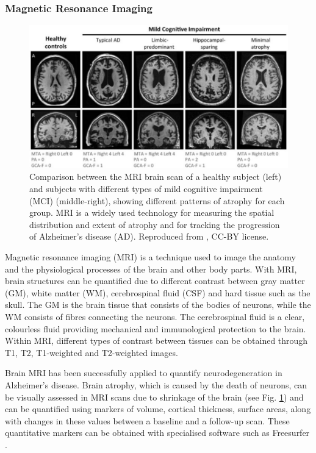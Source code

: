 \subsubsection{Magnetic Resonance Imaging}
\label{sec:bckMri}

\begin{figure}
\centering
\includegraphics[width=1.0\textwidth]{images/adAtrophy3}
\caption[Comparison between the MRI brain scans of healthy subjects and subjects with mild cognitive impairment]{Comparison between the MRI brain scan of a healthy subject (left) and subjects with different types of mild cognitive impairment (MCI) (middle-right), showing different patterns of atrophy for each group. MRI is a widely used technology for measuring the spatial distribution and extent of atrophy and for tracking the progression of Alzheimer's disease (AD). Reproduced from \cite{ekman2018t}, CC-BY license.}
\label{fig:bckAdAtrophy}
\end{figure}

Magnetic resonance imaging (MRI) is a technique used to image the anatomy and the physiological processes of the brain and other body parts. With MRI, brain structures can be quantified due to different contrast between gray matter (GM), white matter (WM), cerebrospinal fluid (CSF) and hard tissue such as the skull. The GM is the brain tissue that consists of the bodies of neurons, while the WM consists of fibres connecting the neurons. The cerebrospinal fluid is a clear, colourless fluid providing mechanical and immunological protection to the brain. Within MRI, different types of contrast between tissues can be obtained through T1, T2, T1-weighted and T2-weighted images. 

Brain MRI has been successfully applied to quantify neurodegeneration in Alzheimer's disease. Brain atrophy, which is caused by the death of neurons, can be visually assessed in MRI scans due to shrinkage of the brain (see Fig. \ref{fig:bckAdAtrophy}) and can be quantified using markers of volume, cortical thickness, surface areas, along with changes in these values between a baseline and a follow-up scan. These quantitative markers can be obtained with specialised software such as Freesurfer \cite{reuter2012within}.

